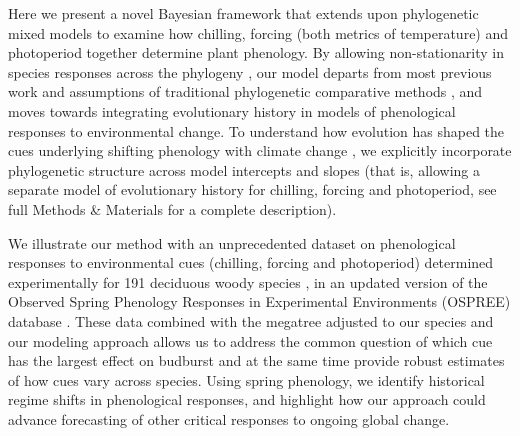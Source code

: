 \documentclass[11pt]{article}
\begin{document}
Here we present a novel Bayesian framework that extends upon phylogenetic mixed models \citep{housworth2004phylogenetic} to examine how chilling, forcing (both metrics of temperature) and photoperiod together determine plant phenology. By allowing non-stationarity in species responses across the phylogeny \citep{davies2019phylogenetically}, our model departs from most previous work and assumptions of traditional phylogenetic comparative methods \citep[e.g.][]{freckleton2002phylogenetic,ives2011generalized,hadfield2010mcmc}, and moves towards integrating evolutionary history in models of phenological responses to environmental change. To understand how evolution has shaped the cues underlying shifting phenology with climate change \citep{uyeda2017evolution}, we explicitly incorporate phylogenetic structure across model intercepts and slopes (that is, allowing a separate model of evolutionary history for chilling, forcing and photoperiod, see full Methods \& Materials for a complete description). 

We illustrate our method with an unprecedented dataset on phenological responses to environmental cues (chilling, forcing and photoperiod) determined experimentally for 191 deciduous woody species \cite[by far the most studied group of species in phenology experiments, see][]{ettinger2020}, in an updated version of the Observed Spring Phenology Responses in Experimental Environments (OSPREE) database \citep{wolkovich2019}. These data combined with the \citet{smith2018constructing} megatree adjusted to our species and our modeling approach allows us to address the common question of which cue has the largest effect on budburst and at the same time provide robust estimates of how cues vary across species. Using spring phenology, we identify historical regime shifts \citep{uyeda2017evolution} in phenological responses, and highlight how our approach could advance forecasting of other critical responses to ongoing global change.



\end{document}
